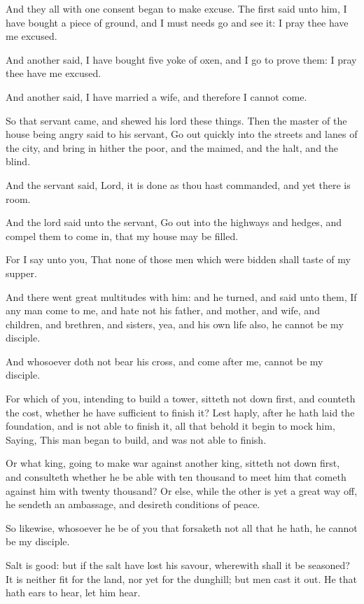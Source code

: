 \verse And they all with one consent began to make excuse. The first said unto him, I have bought a piece of ground, and I must needs go and see it: I pray thee have me excused.

\verse And another said, I have bought five yoke of oxen, and I go to prove them: I pray thee have me excused.

\verse And another said, I have married a wife, and therefore I cannot come.

\verse So that servant came, and shewed his lord these things. Then the master of the house being angry said to his servant, Go out quickly into the streets and lanes of the city, and bring in hither the poor, and the maimed, and the halt, and the blind.

\verse And the servant said, Lord, it is done as thou hast commanded, and yet there is room.

\verse And the lord said unto the servant, Go out into the highways and hedges, and compel them to come in, that my house may be filled.

\verse For I say unto you, That none of those men which were bidden shall taste of my supper.

\verse And there went great multitudes with him: and he turned, and said unto them, \verse If any man come to me, and hate not his father, and mother, and wife, and children, and brethren, and sisters, yea, and his own life also, he cannot be my disciple.

\verse And whosoever doth not bear his cross, and come after me, cannot be my disciple.

\verse For which of you, intending to build a tower, sitteth not down first, and counteth the cost, whether he have sufficient to finish it?  \verse Lest haply, after he hath laid the foundation, and is not able to finish it, all that behold it begin to mock him, \verse Saying, This man began to build, and was not able to finish.

\verse Or what king, going to make war against another king, sitteth not down first, and consulteth whether he be able with ten thousand to meet him that cometh against him with twenty thousand?  \verse Or else, while the other is yet a great way off, he sendeth an ambassage, and desireth conditions of peace.

\verse So likewise, whosoever he be of you that forsaketh not all that he hath, he cannot be my disciple.

\verse Salt is good: but if the salt have lost his savour, wherewith shall it be seasoned?  \verse It is neither fit for the land, nor yet for the dunghill; but men cast it out. He that hath ears to hear, let him hear.


